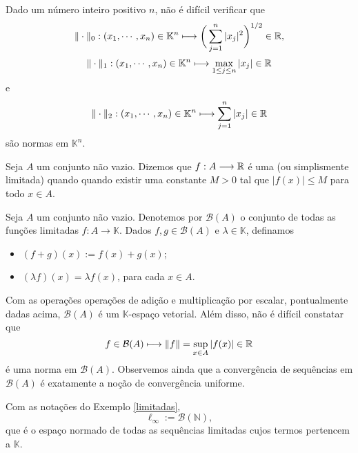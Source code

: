 \begin{example}\label{ex21}
    Dado um número inteiro positivo $n$, não é difícil verificar que
    \[
    \displaystyle \|\cdot \|_0 : (x_1,\cdots , x_n) \in \mathbb K^n \longmapsto \bigg( \sum_{j=1}^{n} |x_j|^2\bigg)^{1/2} \in \mathbb{R} ,
    \]
    \[
    \displaystyle \|\cdot \|_1 : (x_1,\cdots , x_n) \in \mathbb K^n \longmapsto \max_{1\leq j \leq n} |x_j| \in \mathbb{R} 
    \]
    e
    \[
    \displaystyle \|\cdot \|_2 : (x_1,\cdots , x_n) \in \mathbb K^n \longmapsto \sum_{j=1}^{n} |x_j| \in \mathbb{R} 
    \]
    são normas em $\mathbb K ^n$.
\end{example}

\begin{definition}
Seja $A$ um conjunto não vazio. Dizemos que $f:A\longrightarrow \mathbb{R}$ é uma  (ou simplismente limitada) quando  quando existir uma constante  $M>0$ tal que $|f(x)|\leq M$ para todo $x\in A$.
\end{definition}

\begin{example}\label{limitadas}
Seja $A$ um conjunto não vazio. Denotemos por $\mathcal B (A)$ o conjunto de todas as funções limitadas $f: A\longrightarrow \mathbb K$. Dados $f,g \in \mathcal B (A)$ e $\lambda \in \mathbb K$, definamos
\begin{itemize}
\item $(f+g)(x):=f(x)+g(x)$; 
\item $(\lambda f)(x) = \lambda f(x)$,
para cada $x\in A$.
\end{itemize}
Com as operações operações de adição e multiplicação por escalar, pontualmente dadas acima, $\mathcal B (A)$ é um $\mathbb K$-espaço vetorial. Além disso, não é difícil constatar que
\[
\displaystyle f\in \mathcal B (A) \longmapsto \| f\| = \sup_{x\in A} |f(x)| \in \mathbb{R}
\]
é uma norma em $\mathcal B (A)$. Observemos ainda que a convergência de sequências em $\mathcal B (A)$ é exatamente a noção de convergência uniforme. 
\end{example}

\begin{definition}
    Com as notações do Exemplo \ref{limitadas},
    \[
    \ell_{\infty} := \mathcal B (\mathbb N),
    \]
    que é o espaço normado de todas as sequências limitadas cujos termos pertencem a $\mathbb K$.
\end{definition}


